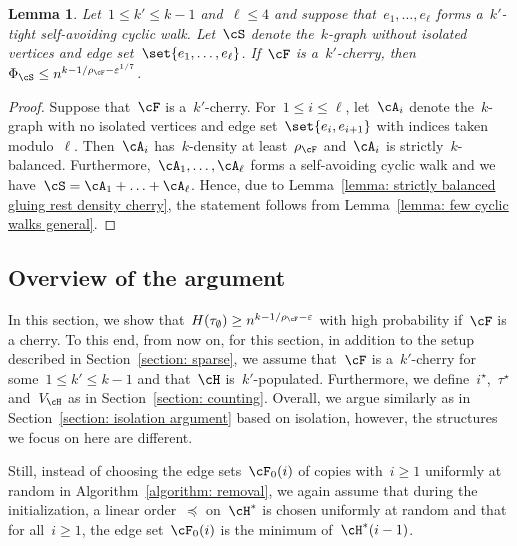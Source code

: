 \documentclass[11pt]{amsart}
\newcommand{\eps}{\varepsilon}
\newtheorem{lemma}[algocf]{Lemma}
\theoremstyle{definition}
\numberwithin{equation}{section}
\begin{document}
	
	\begin{lemma}\label{lemma: few cyclic walks cherry}
		Let~$1\leq k'\leq k-1$ and~$\ell\leq 4$ and suppose that~$e_1,\ldots,e_\ell$ forms a~$k'$-tight self-avoiding cyclic walk.
		Let~$\cS$ denote the~$k$-graph without isolated vertices and edge set~$\set{e_1,\ldots,e_\ell}$.
		If~$\cF$ is a~$k'$-cherry, then~$\Phi_{\cS}\leq n^{k-1/\rho_\cF-\eps^{1/7}}$.
	\end{lemma}
	\begin{proof}
		Suppose that~$\cF$ is a~$k'$-cherry.
		For~$1\leq i\leq\ell$, let~$\cA_i$ denote the~$k$-graph with no isolated vertices and edge set~$\set{e_i,e_{i+1}}$ with indices taken modulo~$\ell$.
		Then~$\cA_i$ has~$k$-density at least~$\rho_\cF$ and~$\cA_i$ is strictly~$k$-balanced.
		Furthermore,~$\cA_1,\ldots,\cA_\ell$ forms a self-avoiding cyclic walk and we have~$\cS=\cA_1+\ldots+\cA_\ell$.
		Hence, due to Lemma~\ref{lemma: strictly balanced gluing rest density cherry}, the statement follows from Lemma~\ref{lemma: few cyclic walks general}.
	\end{proof}
	
	\subsection{Overview of the argument}
	In this section, we show that~$H(\tau_\emptyset)\geq n^{k-1/\rho_\cF-\eps}$ with high probability if~$\cF$ is a cherry.
	To this end, from now on, for this section, in addition to the setup described in Section~\ref{section: sparse}, we assume that~$\cF$ is a~$k'$-cherry for some~$1\leq k'\leq k-1$ and that~$\cH$ is~$k'$-populated.
	Furthermore, we define~$i^\star$,~$\tau^\star$ and~$V_\cH$ as in Section~\ref{section: counting}.
	Overall, we argue similarly as in Section~\ref{section: isolation argument} based on isolation, however, the structures we focus on here are different.
	
	Still, instead of choosing the edge sets~$\cF_0(i)$ of copies with~$i\geq 1$ uniformly at random in Algorithm~\ref{algorithm: removal}, we again assume that during the initialization, a linear order~$\preceq$ on~$\cH^*$ is chosen uniformly at random and that for all~$i\geq 1$, the edge set~$\cF_0(i)$ is the minimum of~$\cH^*(i-1)$.
	
\end{document}
